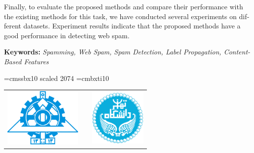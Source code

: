 \documentclass[twoside, a4paper,11pt]{book}
\numberwithin{equation}{chapter}
\numberwithin{table}{chapter}
\numberwithin{figure}{chapter}
\numberwithin{equation}{chapter}
\begin{document}
\begin{latin}
\begin{doublespace}
Finally, to evaluate the proposed methods and compare their performance with the existing methods for this task, we have conducted several experiments on different datasets. Experiment results indicate that the proposed methods have a good performance in detecting web spam.




\end{doublespace}
{\par\vspace{2mm}}
\noindent\textbf{Keywords: }\textit{Spamming, Web Spam, Spam Detection, Label Propagation, Content-Based Features}

\newpage
\mbox{}


\font\titlefont=cmssbx10 scaled 2074
\font\supervisorfont=cmbxti10
\newpage
\thispagestyle{empty}
\begin{center}
\begin{tabular}{lp{7cm}r}
\includegraphics[width=3.8cm]{Figures/eng.png} & & \includegraphics[width=2.8cm]{Figures/ut.png} \\
\end{tabular}


\end{center}
\end{latin}
\end{document}
